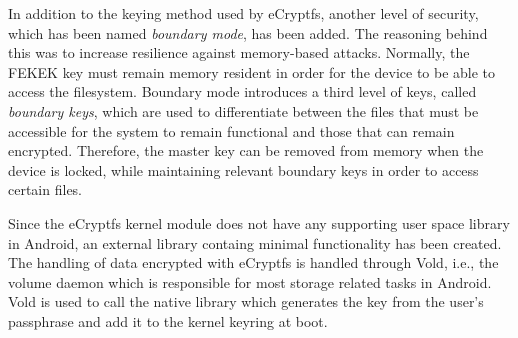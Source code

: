 In addition to the keying method used by eCryptfs, another level of security, which has been named \textit{boundary mode}, has been added. The reasoning behind this was to increase resilience against memory-based attacks. Normally, the FEKEK key must remain memory resident in order for the device to be able to access the filesystem. Boundary mode introduces a third level of keys, called \textit{boundary keys}, which are used to differentiate between the files that must be accessible for the system to remain functional and those that can remain encrypted. Therefore, the master key can be removed from memory when the device is locked, while maintaining relevant boundary keys in order to access certain files.

Since the eCryptfs kernel module does not have any supporting user space library in Android, an external library containg minimal functionality has been created. The handling of data encrypted with eCryptfs is handled through Vold, i.e., the volume daemon which is responsible for most storage related tasks in Android. Vold is used to call the native library which generates the key from the user's passphrase and add it to the kernel keyring at boot.